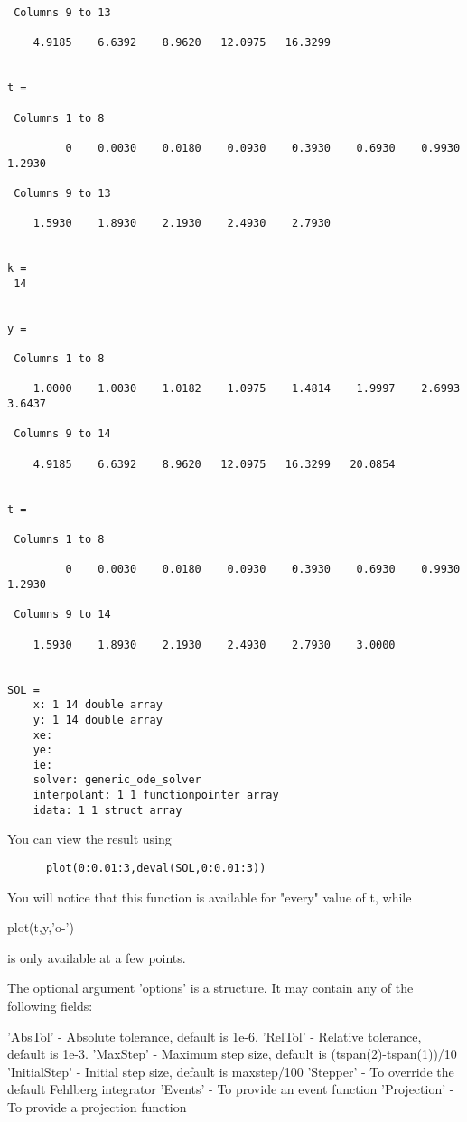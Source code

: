 \begin{verbatim}
 Columns 9 to 13

    4.9185    6.6392    8.9620   12.0975   16.3299 


t = 

 Columns 1 to 8

         0    0.0030    0.0180    0.0930    0.3930    0.6930    0.9930    1.2930 

 Columns 9 to 13

    1.5930    1.8930    2.1930    2.4930    2.7930 


k = 
 14 


y = 

 Columns 1 to 8

    1.0000    1.0030    1.0182    1.0975    1.4814    1.9997    2.6993    3.6437 

 Columns 9 to 14

    4.9185    6.6392    8.9620   12.0975   16.3299   20.0854 


t = 

 Columns 1 to 8

         0    0.0030    0.0180    0.0930    0.3930    0.6930    0.9930    1.2930 

 Columns 9 to 14

    1.5930    1.8930    2.1930    2.4930    2.7930    3.0000 


SOL = 
    x: 1 14 double array
    y: 1 14 double array
    xe: 
    ye: 
    ie: 
    solver: generic_ode_solver
    interpolant: 1 1 functionpointer array
    idata: 1 1 struct array
\end{verbatim}
 You can view the result using
\begin{verbatim}
      plot(0:0.01:3,deval(SOL,0:0.01:3))
\end{verbatim}
 You will notice that this function is available for "every" value of t, while

      plot(t,y,'o-')

 is only available at a few points.

 The optional argument 'options' is a structure. It may contain any of the
 following fields:

 'AbsTol'      - Absolute tolerance, default is 1e-6.
 'RelTol'      - Relative tolerance, default is 1e-3.
 'MaxStep'     - Maximum step size, default is (tspan(2)-tspan(1))/10
 'InitialStep' - Initial step size, default is maxstep/100
 'Stepper'     - To override the default Fehlberg integrator
 'Events'      - To provide an event function
 'Projection'  - To provide a projection function

